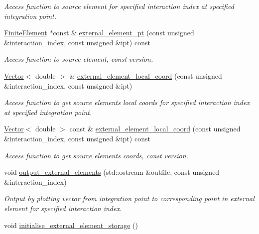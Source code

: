 \begin{DoxyCompactItemize}
\begin{DoxyCompactList}\small\item\em Access function to source element for specified interaction index at specified integration point. \end{DoxyCompactList}\item 
\hyperlink{classoomph_1_1FiniteElement}{Finite\+Element} $\ast$const  \& \hyperlink{classoomph_1_1ElementWithExternalElement_a1207eae30d379008502855f6a40021ab}{external\+\_\+element\+\_\+pt} (const unsigned \&interaction\+\_\+index, const unsigned \&ipt) const
\begin{DoxyCompactList}\small\item\em Access function to source element, const version. \end{DoxyCompactList}\item 
\hyperlink{classoomph_1_1Vector}{Vector}$<$ double $>$ \& \hyperlink{classoomph_1_1ElementWithExternalElement_a0f4b305e2da000ad7523ab02163c36cb}{external\+\_\+element\+\_\+local\+\_\+coord} (const unsigned \&interaction\+\_\+index, const unsigned \&ipt)
\begin{DoxyCompactList}\small\item\em Access function to get source element\textquotesingle{}s local coords for specified interaction index at specified integration point. \end{DoxyCompactList}\item 
\hyperlink{classoomph_1_1Vector}{Vector}$<$ double $>$ const  \& \hyperlink{classoomph_1_1ElementWithExternalElement_af9da1e0b0cc58d18e32967763a697765}{external\+\_\+element\+\_\+local\+\_\+coord} (const unsigned \&interaction\+\_\+index, const unsigned \&ipt) const
\begin{DoxyCompactList}\small\item\em Access function to get source element\textquotesingle{}s coords, const version. \end{DoxyCompactList}\item 
void \hyperlink{classoomph_1_1ElementWithExternalElement_a081a1881e0e5844e731178f277c17f1c}{output\+\_\+external\+\_\+elements} (std\+::ostream \&outfile, const unsigned \&interaction\+\_\+index)
\begin{DoxyCompactList}\small\item\em Output by plotting vector from integration point to corresponding point in external element for specified interaction index. \end{DoxyCompactList}\item 
void \hyperlink{classoomph_1_1ElementWithExternalElement_a1df25bb9135b84569486401f86c11b5a}{initialise\+\_\+external\+\_\+element\+\_\+storage} ()

\end{DoxyCompactItemize}
